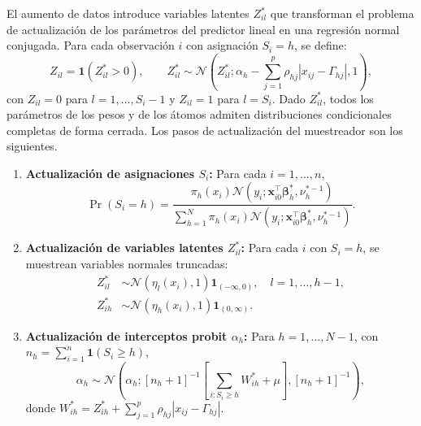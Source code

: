 El aumento de datos introduce variables latentes $Z_{il}^*$ que transforman el problema de actualización de los parámetros del predictor lineal en una regresión normal conjugada. Para cada observación $i$ con asignación $S_i = h$, se define:
\begin{equation}\label{eq:augmentation}
    Z_{il} = \mathbf{1}(Z_{il}^* > 0),
    \qquad
    Z_{il}^* \sim \mathcal{N}\!\left(Z_{il}^*;
    \alpha_h - \sum_{j=1}^{p}\rho_{hj}|x_{ij} - \Gamma_{hj}|,
    1\right),
\end{equation}
con $Z_{il} = 0$ para $l = 1, \dots, S_i - 1$ y $Z_{il} = 1$ para $l = S_i$. Dado $Z_{il}^*$, todos los parámetros de los pesos y de los átomos admiten distribuciones condicionales completas de forma cerrada. Los pasos de actualización del muestreador son los siguientes.
 
\begin{enumerate}
 
    \item \textbf{Actualización de asignaciones $S_i$:} Para cada
    $i = 1, \dots, n$,
    \begin{equation}
        \Pr(S_i = h) = \frac{\pi_h(x_i)
        \mathcal{N}(y_i; \mathbf{x}_{i0}^\top
        \boldsymbol{\beta}_h^*, \nu_h^{*-1})}
        {\sum_{h=1}^{N}\pi_h(x_i)
        \mathcal{N}(y_i; \mathbf{x}_{i0}^\top
        \boldsymbol{\beta}_h^*, \nu_h^{*-1})}.
    \end{equation}
 
    \item \textbf{Actualización de variables latentes $Z_{il}^*$:}
    Para cada $i$ con $S_i = h$, se muestrean variables normales
    truncadas:
    \begin{align*}
        Z_{il}^* &\sim \mathcal{N}\!\left(\eta_l(x_i), 1\right)
        \mathbf{1}_{(-\infty, 0)}, \quad l = 1, \dots, h-1,\\
        Z_{ih}^* &\sim \mathcal{N}\!\left(\eta_h(x_i), 1\right)
        \mathbf{1}_{(0, \infty)}.
    \end{align*}
 
    \item \textbf{Actualización de interceptos probit $\alpha_h$:}
    Para $h = 1, \dots, N-1$, con $n_h = \sum_{i=1}^n \mathbf{1}(S_i
    \geq h)$,
    \begin{equation}
        \alpha_h \sim \mathcal{N}\!\left(\alpha_h;
        [n_h + 1]^{-1}\!\left[\sum_{i: S_i \geq h} W_{ih}^*
        + \mu\right], [n_h + 1]^{-1}\right),
    \end{equation}
    donde $W_{ih}^* = Z_{ih}^* + \sum_{j=1}^{p}\rho_{hj}
    |x_{ij} - \Gamma_{hj}|$.
 

\end{enumerate}
